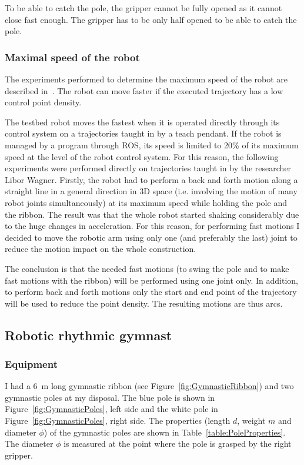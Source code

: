             To be able to catch the pole, the gripper cannot be fully opened as it cannot close fast enough. The gripper has to be only half opened to be able to catch the pole.

        \subsubsection{Maximal speed of the \CloPeMa\/ robot}
            The experiments performed to determine the maximum speed of the robot are described in~\cite{WagnerMaxRobotSpeed}. The robot can move faster if the executed trajectory has a low control point density.

            The \CloPeMa\/ testbed robot moves the fastest when it is operated directly through its control system on a trajectories taught in by a teach pendant. If the robot is managed by a program through ROS, its speed is limited to 20\% of its maximum speed at the level of the robot control system. For this reason, the following experiments were performed directly on trajectories taught in by the \CloPeMa\/ researcher Libor Wagner. Firstly, the robot had to perform a back and forth motion along a straight line in a general direction in 3D space (i.e. involving the motion of many robot joints simultaneously) at its maximum speed while holding the pole and the ribbon. The result was that the whole robot started shaking considerably due to the huge changes in acceleration. For this reason, for performing fast motions I decided to move the robotic arm using only one (and preferably the last) joint to reduce the motion impact on the whole construction.

            The conclusion is that the needed fast motions (to swing the pole and to make fast motions with the ribbon) will be performed using one joint only. In addition, to perform back and forth motions only the start and end point of the trajectory will be used to reduce the point density. The resulting motions are thus arcs.

    \subsection{Robotic rhythmic gymnast}
        \subsubsection{Equipment}
            I had a \SI{6}{m} long gymnastic ribbon (see Figure~\ref{fig:GymnasticRibbon}) and two gymnastic poles  at my disposal. The blue pole is shown in Figure~\ref{fig:GymnasticPoles}, left side  and the white pole in Figure~\ref{fig:GymnasticPoles}, right side. The properties (length $d$, weight $m$ and diameter $\phi$) of the gymnastic poles are shown in Table~\ref{table:PoleProperties}. The diameter $\phi$ is measured at the point where the pole is grasped by the right gripper.

